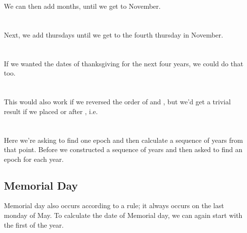 \documentclass[article]{jss}
\begin{document}
\\
\\

We can then add months, until we get to November.\\

\\
\\

Next, we add thursdays until we get to the fourth thursday in November.\\

\\
\\

If we wanted the dates of thanksgiving for the next four years, we could do that too.\\

\\
\\

This would also work if we reversed the order of  and , but we'd get a trivial result if we placed  or  after , i.e.\\

\\
\\

Here we're asking  to find one epoch and then calculate a sequence of years from that point. Before we constructed a sequence of years and then asked  to find an epoch for each year.

\subsection{Memorial Day}
Memorial day also occurs according to a rule; it always occurs on the last monday of May. To calculate the date of Memorial day, we can again start with the first of the year.\\

\\
\\
\end{document}
